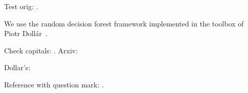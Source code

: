 Test orig: \cite{LimZD13}.

We use the random decision forest framework implemented in the toolbox of Piotr Doll\'ar~\cite{Dollar2013toolbox}.

Check capitals: \cite{Arbelaez09}. %
Arxiv: \cite{Hallman2014}

Dollar's: \cite{Dollar2014fast,DollarICCV13edges}

Reference with question mark: \cite{Fowlkes04}.

% 
